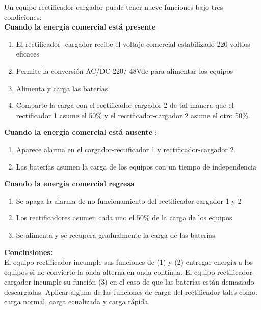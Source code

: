 \documentclass[
	12pt, %
	fleqn, %
	a4paper, %
]{LegrandOrangeBook}
\begin{document}
\begin{example}
Un equipo rectificador-cargador puede tener nueve funciones bajo tres condiciones:\\
\textbf{Cuando la energía comercial está presente}
\begin{enumerate}
\item El rectificador -cargador recibe el voltaje comercial estabilizado 220 voltios eficaces
\item Permite la conversión AC/DC 220/-48Vdc para alimentar los equipos
\item Alimenta y carga las baterías
\item Comparte la carga con el rectificador-cargador 2 de tal manera que el rectificador 1 asume
el 50\% y el rectificador-cargador 2 asume el otro 50\%.
\end{enumerate}
\textbf{Cuando la energía comercial está ausente
}:
\begin{enumerate}
\item Aparece alarma en el cargador-rectificador 1 y rectificador-cargador 2
\item Las baterías asumen la carga de los equipos con un tiempo de independencia
\end{enumerate}
\textbf{Cuando la energía comercial regresa}
\begin{enumerate}
\item Se apaga la alarma de no funcionamiento del rectificador-cargador 1 y 2
\item Los rectificadores asumen cada uno el 50\% de la carga de los equipos
\item Se alimenta y se recupera gradualmente la carga de las baterías
\end{enumerate}
\textbf{Conclusiones:}\\
El equipo rectificador incumple sus funciones de (1) y (2) entregar energía a los equipos si no convierte la onda alterna en onda continua. El equipo rectificador-cargador incumple su función (3) en el caso de que las baterías están demasiado descargadas. Aplicar alguna de las funciones de carga del rectificador tales como: carga normal, carga ecualizada y carga rápida.
\end{example}
\end{document}
